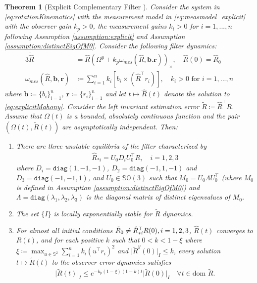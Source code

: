 \documentclass{article}
\newcommand{\dom}{\text{dom }}
\newcommand{\SOthree}{\mathbb{SO}(3)}
\newcommand{\Omegay}{\Omega^y}
\newtheorem{theorem}{Theorem}
\newcommand{\brackets}[1]{\left(#1\right)}
\newcommand{\Rtilde}{\tilde{R}}
\newcommand{\normSOthree}[1]{{{\vert}#1 {\vert}_I}}
\newcommand{\expo}[1]{e^{#1}}
\begin{document}
\begin{theorem}[Explicit Complementary Filter {\cite[Theorem 5.1]{mahony_complementaryFilter}}]\label{theorem:explicitMahony}
Consider the system in \eqref{eq:rotationKinematics} with the measurement model in \eqref{eq:measmodel_explicit} with the observer gain $k_p > 0$, the measurement gains $k_i>0$ for $i=1,...,n$ following Assumption \ref{assumption:explicit} and Assumption \ref{assumption:distinctEigOfM0}. Consider the following filter dynamics:
\begin{alignat}{3}\label{eq:explicitMahony}
    \dot{\hat{R}} &= \hat{R}\brackets{\Omegay + k_p\omega_{mes}(\hat{R}, \mathbf{b}. \mathbf{r})}_\times, \quad \hat{R}(0) = \hat{R}_0\\
    \omega_{mes}(\hat{R}, \mathbf{b}, \mathbf{r})&\coloneqq \sum_{i=1}^n k_i \left[b_i\times (\hat{R}^\top r_i)\right],\quad k_i> 0 \text{ for } i=1,...,n
\end{alignat}
where $\mathbf{b}\coloneqq \{b_i\}_{i=1}^n$, $\mathbf{r}\coloneqq \{r_i\}_{i=1}^n$ and let $t\mapsto \hat{R}(t)$ denote the solution to \eqref{eq:explicitMahony}. Consider the left invariant estimation error $\Rtilde\coloneqq \hat{R}^\top R$. Assume that $\Omega(t)$ is a bounded, absolutely continuous function and the pair $(\Omega(t), \Rtilde(t))$ are asymptotically independent. Then:
\begin{enumerate}
    \item There are three unstable equilibria of the filter characterized by
    \begin{align*}
        \hat{R}_{*i} = U_0D_iU_0^\top R, \quad i=1,2,3
    \end{align*}
    where $D_i = \texttt{diag}(1,-1,-1)$, $D_2 = \texttt{diag}(-1,1,-1)$ and $D_3=\texttt{diag}(-1,-1,1)$, and $U_0\in\SOthree$ such that $M_0 = U_0\Lambda U_0^\top $ (where $M_0$ is defined in Assumption \ref{assumption:distinctEigOfM0}) and $\Lambda = \texttt{diag}(\lambda_1, \lambda_2, \lambda_3)$ is the diagonal matrix of distinct eigenvalues of $M_0$. \label{item:a-mahony-ecf}
    \item The set $\{I\}$ is locally exponentially stable for $\Rtilde$ dynamics. \label{item:b-mahony-ecf}
    \item For almost all initial conditions $\Tilde{R}_0\neq \hat{R}^\top _{*i}R(0), i=1,2,3$, $\hat{R}(t)$ converges to $R(t)$, and for each positive $k$ such that $0 < k < 1-\xi$ where $\xi \coloneqq \max_{u\in\mathbb{S}^2}\sum_{i=1}^n k_i(u^\top r_i)^2$ and $\normSOthree{\Rtilde^y(0)}\leq k$, every solution $t\mapsto \Rtilde(t)$ to the observer error dynamics satisfies \label{item:c-mahony-ecf}
    \begin{align} \label{eq:localExpStability_ECF}
    \normSOthree{\Rtilde(t)}\leq \expo{-k_p(1-\xi)(1-k)t}\normSOthree{\Rtilde(0)}\quad \forall t\in\dom\Rtilde.
\end{align}
\end{enumerate}
\end{theorem}
\end{document}
